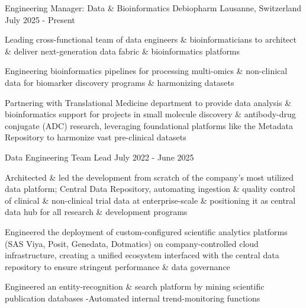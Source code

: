 

\begin{cventries}

\vspace{-0.2cm}
\cventry
    {Engineering Manager: Data \& Bioinformatics}
    {Debiopharm}
    {Lausanne, Switzerland}
    {July 2025 - Present}
    {
      \begin{cvitems}
        \item Leading cross-functional team of data engineers \& bioinformaticians to architect \& deliver next-generation data fabric \& bioinformatics platforms
        \item Engineering bioinformatics pipelines for processing multi-omics \& non-clinical data for biomarker discovery programs \& harmonizing datasets
        \item Partnering with Translational Medicine department to provide data analysis \& bioinformatics support for projects in small molecule discovery \& antibody-drug conjugate (ADC) research, leveraging foundational platforms like the Metadata Repository to harmonize vast pre-clinical datasets
      \end{cvitems}
    }
\vspace{0.1cm}
\cventry
    {Data Engineering Team Lead}
    {}
    {}
    {July 2022 - June 2025}
    {
      \begin{cvitems}
        \item Architected \& led the development from scratch of the company's most utilized data platform; Central Data Repository, automating ingestion \& quality control of clinical \& non-clinical trial data at enterprise-scale \& positioning it as central data hub for all research \& development programs
        \item Engineered the deployment of custom-configured scientific analytics platforms (SAS Viya, Posit, Genedata, Dotmatics) on company-controlled cloud infrastructure, creating a unified ecosystem interfaced with the central data repository to ensure stringent performance \& data governance
        \item Engineered an entity-recognition \& search platform by mining scientific publication databases -Automated internal trend-monitoring functions

\end{cvitems}}
\end{cventries}
